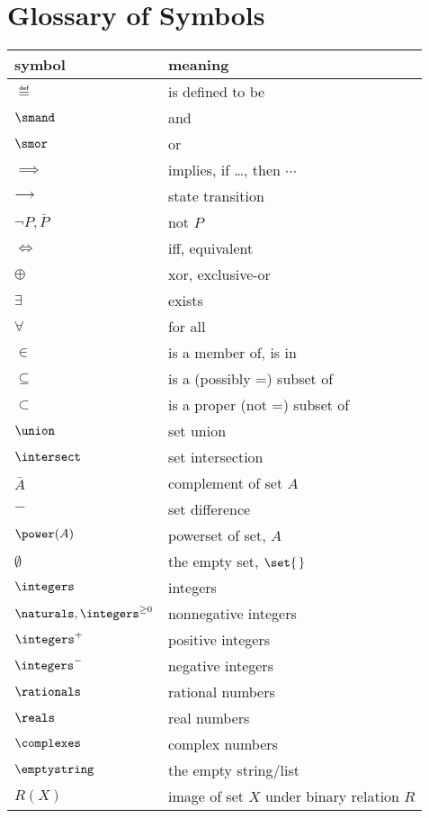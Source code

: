 \section{Glossary of Symbols}

\begin{center}
\begin{tabular}{ll}
symbol         &  meaning\\
\hline
$\eqdef$       & is defined to be\\
$\smand$       & and\\
$\smor$        & or\\
$\implies$     & implies, if \dots, then $\cdots$\\
$\mathrel{\longrightarrow}$     & state transition\\
$\neg P, \bar{P}$      & not $P$\\
$\iff$         & iff, equivalent\\
$\oplus$       & xor, exclusive-or\\
$\exists$      & exists\\
$\forall$      & for all\\
$\in$          & is a member of, is in\\
$\subseteq$    & is a (possibly =) subset of\\
$\subset$      & is a proper (not =) subset of\\
$\union$       & set union\\
$\intersect$   & set intersection\\
$\bar{A}$      & complement of set $A$\\
$-$            & set difference\\
$\power(A)$    & powerset of set, $A$\\
$\emptyset$    & the empty set, $\set{\,}$\\
$\integers$    & integers\\
$\naturals, \integers^{\ge 0}$    & nonnegative integers \\
$\integers^{+}$ & positive integers\\
$\integers^{-}$ & negative integers\\
$\rationals$   & rational numbers\\
$\reals$       & real numbers\\
$\complexes$   & complex numbers\\
$\emptystring$ & the empty string/list\\
$R(X)$         & image of set $X$ under binary relation $R$\\

\end{tabular}
\end{center}
